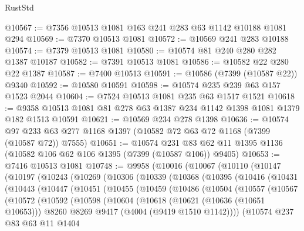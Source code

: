\begin{lexlean}{RustStd}
\begin{coremodule}
@10567 := @7356 @10513 @1081 @163 @241 @283 @63 @1142 @10188 @1081 @294
@10569 := @7370 @10513 @1081
@10572 := @10569 @241 @283 @10188
@10574 := @7379 @10513 @1081
@10580 := @10574 @81 @240 @280 @282 @1387 @10187
@10582 := @7391 @10513 @1081
@10586 := @10582 @22 @280 @22 @1387
@10587 := @7400 @10513
@10591 := @10586 (@7399 (@10587 @22)) @9340
@10592 := @10580 @10591
@10598 := @10574 @235 @239 @63 @157 @1523 @2044
@10604 := @7524 @10513 @1081 @235 @63 @1517 @1521
@10618 := @9358 @10513 @1081 @81 @278 @63 @1387 @234 @1142 @1398 @1081 @1379 @182 @1513 @10591
@10621 := @10569 @234 @278 @1398
@10636 := @10574 @97 @233 @63 @277 @1168 @1397 (@10582 @72 @63 @72 @1168 (@7399 (@10587 @72)) @7555)
@10651 := @10574
    @231
    @83
    @62
    @11
    @1395
    @1136
    (@10582 @106 @62 @106 @1395 (@7399 (@10587 @106)) @9405)
@10653 := @7416 @10513 @1081
@10748 := @9958
    (@10016
      (@10067
        (@10110
          (@10147
            (@10197
              (@10243
                (@10269
                  (@10306
                    (@10339
                      (@10368
                        (@10395
                          (@10416
                            (@10431
                              (@10443
                                (@10447
                                  (@10451
                                    (@10455
                                      (@10459
                                        (@10486
                                          (@10504
                                            (@10557
                                              (@10567
                                                (@10572
                                                  (@10592
                                                    (@10598
                                                      (@10604
                                                        (@10618
                                                          (@10621 (@10636 (@10651 @10653)))
                                                          @8260
                                                          @8269
                                                          @9417
                                                          (@4004 (@9419 @1510 @1142))))
                                                      (@10574
                                                        @237
                                                        @83
                                                        @63
                                                        @11
                                                        @1404

\end{coremodule}
\end{lexlean}
